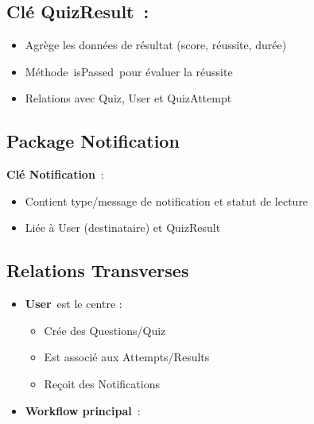 \documentclass[12pt,a4paper,twoside,openright]{report}
\begin{document}
\hypertarget{cle-quizresult}{%
\subsection{Clé QuizResult~:}\label{cle-quizresult}}

\begin{itemize}
\item
  Agrège les données de résultat (score, réussite, durée)
\item
  Méthode~isPassed~pour évaluer la réussite
\item
  Relations avec Quiz, User et QuizAttempt
\end{itemize}

\hypertarget{package-notification}{%
\subsection{\texorpdfstring{ Package
Notification}{ Package Notification}}\label{package-notification}}

\textbf{Clé Notification}~:

\begin{itemize}
\item
  Contient type/message de notification et statut de lecture
\item
  Liée à User (destinataire) et QuizResult
\end{itemize}

\hypertarget{relations-transverses}{%
\subsection{Relations Transverses}\label{relations-transverses}}

\begin{itemize}
\item
  \textbf{User}~est le centre :

  \begin{itemize}
  \item
    Crée des Questions/Quiz
  \item
    Est associé aux Attempts/Results
  \item
    Reçoit des Notifications
  \end{itemize}
\end{itemize}

\begin{itemize}
\item
  \textbf{Workflow principal}~:
\end{itemize}
\end{document}
